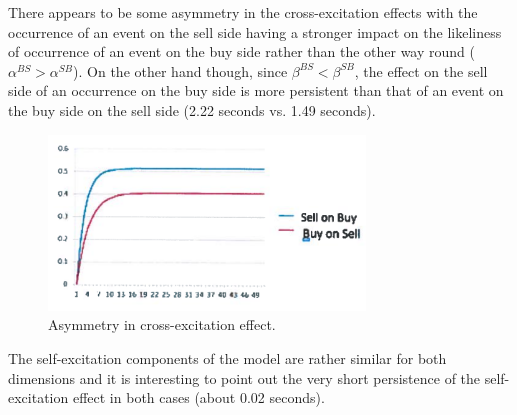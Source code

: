 	
There appears to be some asymmetry in the cross-excitation effects with the occurrence of an event on the sell side having a stronger impact on the likeliness of occurrence of an event on the buy side rather than the other way round ($\alpha^{BS}>\alpha^{SB}$). On the other hand though, since $\beta^{BS}<\beta^{SB}$, the effect on the sell side of an occurrence on the buy side is more persistent than that of an event on the buy side on the sell side (2.22 seconds vs. 1.49 seconds).
	\begin{figure}[!ht]
   	\centering
   	\includegraphics[width=0.75\textwidth]{chapters/chapter_trade_data_models/figures/asymcross.png} 
   	\caption{Asymmetry in cross-excitation effect. \label{fig:asymcross}}
	\end{figure}
The self-excitation components of the model are rather similar for both dimensions and it is interesting to point out the very short persistence of the self-excitation effect in both cases (about 0.02 seconds).


